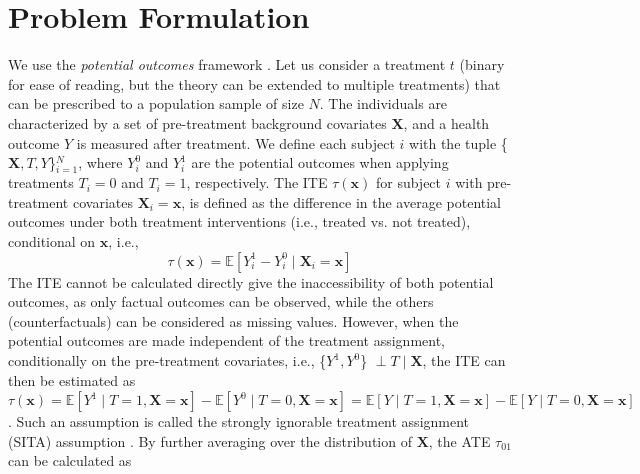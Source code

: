 \documentclass{amia}
\begin{document}

\section*{Problem Formulation}
We use the \emph{potential outcomes} framework \cite{rubin1974, rosenbaum1983}. Let us consider a treatment $t$ (binary for ease of reading, but the theory can be extended to multiple treatments) that can be prescribed to a population sample of size $N$. The individuals are characterized by a set of pre-treatment background covariates $\boldsymbol{X}$, and a health outcome $Y$ is measured after treatment. We define each subject $i$ with the tuple \{$\boldsymbol{X},T,Y$\}$_{i=1}^{N}$, where $Y_{i}^0$ and $Y_{i}^1$ are the potential outcomes when applying treatments $T_i=0$ and $T_i=1$, respectively. The ITE $\tau(\textbf{x})$ for subject $i$ with pre-treatment covariates $\boldsymbol{X}_i=\textbf{x}$, is defined as the difference in the average potential outcomes under both treatment interventions (i.e., treated vs. not treated), conditional on $\textbf{x}$, i.e.,
\begin{equation}
    \tau(\textbf{x})=\mathbb{E}[Y_{i}^1 - Y_{i}^0 \mid \boldsymbol{X}_i = \textbf{x}]
\end{equation}
The ITE cannot be calculated directly give the inaccessibility of both potential outcomes, as only factual outcomes can be observed, while the others (counterfactuals) can be considered as missing values. However, when the potential outcomes are made independent of the treatment assignment, conditionally on the pre-treatment covariates, i.e., \{$Y^1,Y^0$\} $\perp T \mid \boldsymbol{X}$, the ITE can then be estimated as
$
\tau(\textbf{x})=\mathbb{E}[Y^1 \mid T=1, \boldsymbol{X} = \textbf{x}] - \mathbb{E}[Y^0 \mid T=0, \boldsymbol{X} = \textbf{x}] 
= \mathbb{E}[Y \mid T=1, \boldsymbol{X} = \textbf{x}] - \mathbb{E}[Y \mid T=0, \boldsymbol{X} = \textbf{x}]
$. 
Such an assumption is called the strongly ignorable treatment assignment (SITA) assumption \cite{imbens2000role, pearl2016causal}. By further averaging over the distribution of $\boldsymbol{X}$, the ATE $\tau_{01}$ can be calculated as
\end{document}

